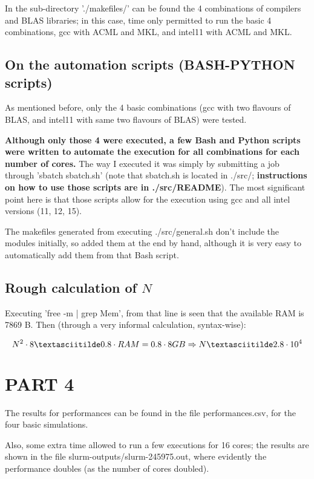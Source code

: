 \documentclass[paper=a4, fontsize=11pt]{scrartcl} %
\numberwithin{equation}{section} %
\numberwithin{figure}{section} %
\numberwithin{table}{section} %
\begin{document}
In the sub-directory './makefiles/' can be found the 4 combinations of compilers and BLAS libraries; in this case, time only permitted to run the basic 4 combinations, gcc with ACML and MKL, and intel11 with ACML and MKL.


\subsection{On the automation scripts (BASH-PYTHON scripts)}

As mentioned before, only the 4 basic combinations (gcc with two flavours of BLAS, and intel11 with same two flavours of BLAS) were tested.

\textbf{Although only those 4 were executed, a few Bash and Python scripts were written to automate the execution for all combinations for each number of cores.} The way I executed it was simply by submitting a job through 'sbatch sbatch.sh' (note that sbatch.sh is located in ./src/; \textbf{instructions on how to use those scripts are in ./src/README}). The most significant point here is that those scripts allow for the execution using gcc and all intel versions (11, 12, 15).

The makefiles generated from executing ./src/general.sh don't include the modules initially, so added them at the end by hand, although it is very easy to automatically add them from that Bash script.


\subsection{Rough calculation of $N$}


Executing 'free -m | grep Mem', from that line is seen that the available RAM is 7869 B. Then (through a very informal calculation, syntax-wise):

$$ N^2 \cdot 8 \textasciitilde 0.8 \cdot RAM = 0.8 \cdot 8GB \Rightarrow N \textasciitilde 2.8 \cdot 10^4 $$





\section{PART 4}

The results for performances can be found in the file performances.csv, for the four basic simulations.

Also, some extra time allowed to run a few executions for 16 cores; the results are shown in the file slurm-outputs/slurm-245975.out, where evidently the performance doubles (as the number of cores doubled).
\end{document}

